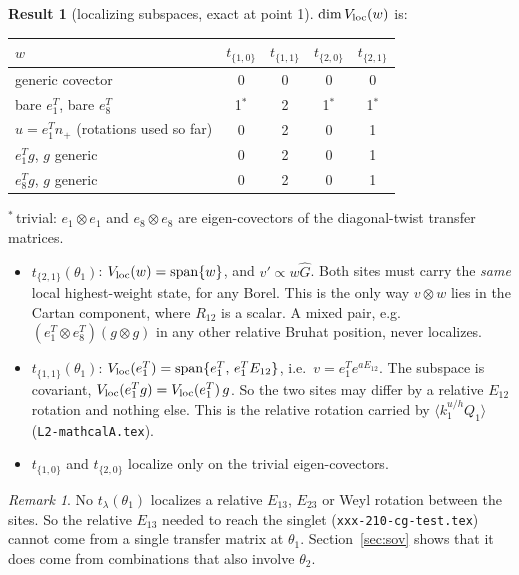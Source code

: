 \documentclass[11pt]{article}
\newcommand{\nb}[1]{\texttt{#1}}
\theoremstyle{definition}
\newtheorem{result}{Result}
\theoremstyle{remark}
\newtheorem*{remark}{Remark}
\begin{document}
\begin{result}[localizing subspaces, exact at point 1]\label{res:vloc}
$\dim V_{\rm loc}(w)$ is:
\begin{center}
\begin{tabular}{lcccc}\toprule
$w$ & $t_{\{1,0\}}$ & $t_{\{1,1\}}$ & $t_{\{2,0\}}$ & $t_{\{2,1\}}$\\\midrule
generic covector & 0 & 0 & 0 & 0\\
bare $e_1^T$, bare $e_8^T$ & 1$^*$ & 2 & 1$^*$ & 1$^*$\\
$u=e_1^Tn_+$ (rotations used so far) & 0 & 2 & 0 & 1\\
$e_1^Tg$, $g$ generic & 0 & 2 & 0 & 1\\
$e_8^Tg$, $g$ generic & 0 & 2 & 0 & 1\\\bottomrule
\end{tabular}
\end{center}
$^*$\,trivial: $e_1\otimes e_1$ and $e_8\otimes e_8$ are eigen-covectors of the diagonal-twist transfer matrices.
\begin{itemize}
\item $t_{\{2,1\}}(\theta_1)$: $V_{\rm loc}(w)=\mathrm{span}\{w\}$, and $v'\propto w\hat G$. Both sites must carry the \emph{same} local highest-weight state, for any Borel. This is the only way $v\otimes w$ lies in the Cartan component, where $R_{12}$ is a scalar. A mixed pair, e.g.\ $(e_1^T\otimes e_8^T)(g\otimes g)$ in any other relative Bruhat position, never localizes.
\item $t_{\{1,1\}}(\theta_1)$: $V_{\rm loc}(e_1^T)=\mathrm{span}\{e_1^T,\,e_1^TE_{12}\}$, i.e.\ $v=e_1^Te^{aE_{12}}$. The subspace is covariant, $V_{\rm loc}(e_1^Tg)=V_{\rm loc}(e_1^T)\,g$. So the two sites may differ by a relative $E_{12}$ rotation and nothing else. This is the relative rotation carried by $\langle k_1^{u/h}Q_1\rangle$ (\nb{L2-mathcalA.tex}).
\item $t_{\{1,0\}}$ and $t_{\{2,0\}}$ localize only on the trivial eigen-covectors.
\end{itemize}
\end{result}

\begin{remark}
No $t_\lambda(\theta_1)$ localizes a relative $E_{13}$, $E_{23}$ or Weyl rotation between the sites. So the relative $E_{13}$ needed to reach the singlet (\nb{xxx-210-cg-test.tex}) cannot come from a single transfer matrix at $\theta_1$. Section~\ref{sec:sov} shows that it does come from combinations that also involve $\theta_2$.
\end{remark}
\end{document}
